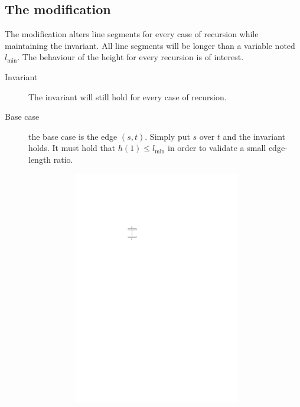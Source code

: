 \subsection{The modification}
The modification alters line segments for every case of recursion while maintaining the invariant. All line segments will be longer than a variable noted $l_{\min}$. The behaviour of the height for every recursion is of interest.
\begin{description}
	\item[Invariant] The invariant will still hold for every case of recursion.
	\item[Base case] the base case is the edge $(s,t)$. Simply put $s$ over $t$ and the invariant holds. It must hold that $h(1) \leq l_{\min}$ in order to validate a small edge-length ratio.
\begin{figure}[H]
	\centering
	\begin{subfigure}{0.2\linewidth}
		\centering
		\includegraphics[width=0.9\textwidth,page=8]{drawings/2-trees.pdf}
	\end{subfigure}

\end{figure}
\end{description}
